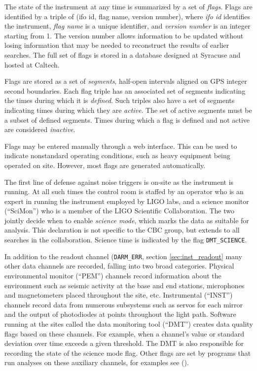 The state of the instrument at any time is summarized by a set of
\emph{flags}.  Flags are identified by a triple of (ifo id, flag name,
version number), where \emph{ifo id} identifies the instrument,
\emph{flag name} is a unique identifier, and \emph{version number} is
an integer starting from 1.  The version number allows information to
be updated without losing information that may be needed to
reconstruct the results of earlier searches.  The full set of flags is
stored in a database designed at Syracuse and hosted at Caltech.

Flags are stored as a set of \emph{segments}, half-open intervals
aligned on GPS integer second boundaries.  Each flag triple has an
associated set of segments indicating the times during which it is
\emph{defined}.  Such triples also have a set of segments indicating
times during which they are \emph{active}.  The set of active segments
must be a subset of defined segments.  Times during which a flag is
defined and not active are considered \emph{inactive}.

Flags may be entered manually through a web interface.  This can be
used to indicate nonstandard operating conditions, such as heavy
equipment being operated on site.  However, most flags are generated
automatically.

The first line of defense against noise triggers is on-site as the
instrument is running.  At all such times the control room is staffed
by an operator who is an expert in running the instrument employed by
LIGO labs, and a science monitor (``SciMon'') who is a member of the
LIGO Scientific Collaboration.  The two jointly decide when to enable
\emph{science mode}, which marks the data as suitable for analysis.
This declaration is not specific to the CBC group, but extends to all
searches in the collaboration.  Science time is indicated by the flag
\texttt{DMT\_SCIENCE}.

In addition to the readout channel (\texttt{DARM\_ERR}, section
\ref{sec:inst_readout} many other data channels are recorded, falling
into two broad categories.  Physical environmental monitor (``PEM'')
channels record information about the environment such as seismic
activity at the base and end stations, microphones and magnetometers
placed throughout the site, etc.  Instrumental (``INST'') channels
record data from numerous subsystems such as servos for each mirror
and the output of photodiodes at points throughout the light path.
Software running at the sites called the data monitoring tool
(``DMT'') creates data quality flags based on these channels.  For
example, when a channel's value or standard deviation over time
exceeds a given threshold.  The DMT is also responsible for recording
the state of the science mode flag.  Other flags are set by programs
that run analyses on these auxiliary channels, for examples see
().


